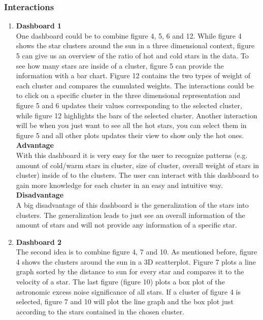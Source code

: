\documentclass{article}
\begin{document}
\subsubsection{Interactions}
\begin{enumerate}
\item \textbf{Dashboard 1} \\
One dashboard could be to combine figure 4, 5, 6 and 12. While figure 4 shows the star clusters around the sun in a three dimensional context, figure 5 can give us an overview of the ratio of hot and cold stars in the data. To see how many stars are inside of a cluster, figure 5 can provide the information with a bar chart. Figure 12 contains the two types of weight of each cluster and compares the cumulated weights. The interactions could be to click on a specific cluster in the three dimensional representation and figure 5 and 6 updates their values corresponding to the selected cluster, while figure 12 highlights the bars of the selected cluster. Another interaction will be when you just want to see all the hot stars, you can select them in figure 5 and all other plots updates their view to show only the hot ones. \\

\textbf{Advantage} \\
With this dashboard it is very easy for the user to recognize patterns (e.g. amount of cold/warm stars in cluster, size of cluster, overall weight of stars in cluster) inside of to the clusters. The user can interact with this dashboard to gain more knowledge for each cluster in an easy and intuitive way. \\

\textbf{Disadvantage} \\
A big disadvantage of this dashboard is the generalization of the stars into clusters. The generalization leads to just see an overall information of the amount of stars and will not provide any information of a specific star. \\

\item \textbf{Dashboard 2} \\
The second idea is to combine figure 4, 7 and 10. As mentioned before, figure 4 shows the clusters around the sun in a 3D scatterplot. Figure 7 plots a line graph sorted by the distance to sun for every star and compares it to the velocity of a star. The last figure (figure 10) plots a box plot of the astronomic excess noise significance of all stars. If a cluster of figure 4 is selected, figure 7 and 10 will plot the line graph and the box plot just according to the stars contained in the chosen cluster. \\


\end{enumerate}
\end{document}
